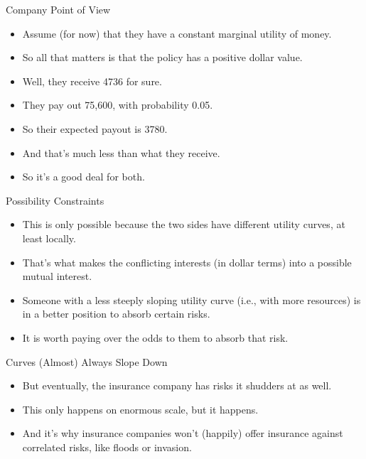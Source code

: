 \documentclass[
  ignorenonframetext,
]{beamer}
\providecommand{\tightlist}{%
  \setlength{\itemsep}{0pt}\setlength{\parskip}{0pt}}
\renewcommand{\,}{\text{, }}
\begin{document}
\begin{frame}{Company Point of View}
\protect\hypertarget{company-point-of-view}{}

\begin{itemize}
\tightlist
\item
  Assume (for now) that they have a constant marginal utility of money.
\item
  So all that matters is that the policy has a positive dollar value.
\item
  Well, they receive 4736 for sure.
\item
  They pay out 75,600, with probability 0.05.
\item
  So their expected payout is 3780.
\item
  And that's much less than what they receive.
\item
  So it's a good deal for both.
\end{itemize}

\end{frame}

\begin{frame}{Possibility Constraints}
\protect\hypertarget{possibility-constraints}{}

\begin{itemize}
\tightlist
\item
  This is only possible because the two sides have different utility
  curves, at least locally.
\item
  That's what makes the conflicting interests (in dollar terms) into a
  possible mutual interest.
\item
  Someone with a less steeply sloping utility curve (i.e., with more
  resources) is in a better position to absorb certain risks.
\item
  It is worth paying over the odds to them to absorb that risk.
\end{itemize}

\end{frame}

\begin{frame}{Curves (Almost) Always Slope Down}
\protect\hypertarget{curves-almost-always-slope-down}{}

\begin{itemize}
\tightlist
\item
  But eventually, the insurance company has risks it shudders at as
  well.
\item
  This only happens on enormous scale, but it happens.
\item
  And it's why insurance companies won't (happily) offer insurance
  against correlated risks, like floods or invasion.
\end{itemize}

\end{frame}
\end{document}
